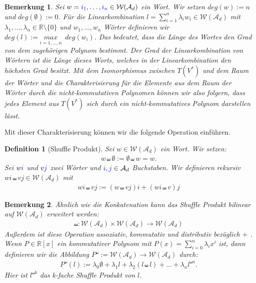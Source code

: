 \documentclass[12pt,titlepage,headsepline]{article}
\newtheorem{definition}{Definition}[section]
\newtheorem*{bemerkung*}{Bemerkung}
\begin{document}
\begin{bemerkung*}
{        \hfill\break
        Sei $w = \textcolor{blue}{i_1,\dotsc,i_n} \in \mathcal{W}(\mathcal{A}_d)$ ein Wort. Wir setzen $deg(w):=n$ und $deg(\emptyset):=0$. Für die Linearkombination $l = \sum_{i=1}^{n} \lambda_i w_i \in \mathcal{W}(\mathcal{A}_d)$ mit $\lambda_1,\dotsc,\lambda_n \in \mathbb{R} \setminus \{ 0 \}$
        und $w_1,\dotsc,w_n$ Wörter definieren wir $deg(l):=\underset{i=1,\dotsc,n}{max} \enspace deg(w_i)$. Das bedeutet, dass die Länge des Wortes den Grad von dem zugehörigen Polynom bestimmt. Der Grad der Linearkombination von Wörtern ist die Länge dieses Worts, welches in der Linearkombination den höchsten Grad besitzt.
        \hfill\break
        Mit dem Isomorphismus zwischen $T(V^*)$ und dem Raum der Wörter und die Charakterisierung für die Elemente aus dem Raum der Wörter durch die nicht-kommutativen Polynomen können wir also folgern, dass jedes Element aus $T(V^*)$ sich durch ein nicht-kommutatives Polynom darstellen lässt.
        }
      \end{bemerkung*}
      Mit dieser Charakterisierung können wir die folgende Operation einführen.
      \begin{definition}[Shuffle Produkt\cite{eilenberg1953groups}]
        Sei $w \in \mathcal{W}(\mathcal{A}_d)$ ein Wort. Wir setzen:
        \begin{align*}
          w \shuffle \emptyset := \emptyset \shuffle w = w.
        \end{align*}
        Sei $w\textcolor{blue}{i}$ und $v\textcolor{blue}{j}$ zwei Wörter und $\textcolor{blue}{i}, \textcolor{blue}{j} \in \mathcal{A}_d$ Buchstaben. Wir definieren rekursiv $wi \shuffle vj \in \mathcal{W}(\mathcal{A}_d)$ mit
        \begin{align*}
          wi \shuffle vj := (w \shuffle vj)i + (wi \shuffle v)j
        \end{align*}
      \end{definition}

      \begin{bemerkung*}
        \textup{
        Ähnlich wie die Konkatenation kann das Shuffle Produkt bilinear auf $\mathcal{W}(\mathcal{A}_d)$ erweitert werden:
        \begin{align*}
          \shuffle: \mathcal{W}(\mathcal{A}_d) \times \mathcal{W}(\mathcal{A}_d) \to \mathcal{W}(\mathcal{A}_d)
        \end{align*}
        Außerdem ist diese Operation assoziativ, kommutativ und distributiv bezüglich $+$ \cite{lothaire_combinatorics_1983}. Wenn $P \in \mathbb{R}[x]$ ein kommutativer Polynom mit $P(x)=\sum_{i=0}^{n} \lambda_i x^i$ ist, dann definieren wir die Abbildung $P^{\shuffle}:=  \mathcal{W}(\mathcal{A}_d) \to \mathcal{W}(\mathcal{A}_d)$ durch:
        \begin{align*}
          P^{\shuffle}(l) := \lambda_0 \emptyset + \lambda_1 l + \lambda_2 (l \shuffle l) + \dotsc + \lambda_n l^{\shuffle n}.
        \end{align*}
        Hier ist $l^{\shuffle k}$ das k-fache Shuffle Produkt von $l$.
        }
      \end{bemerkung*}
\end{document}
